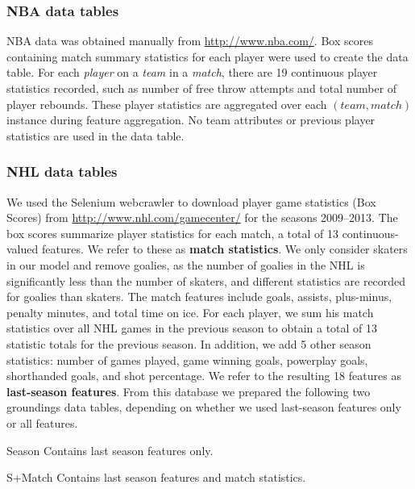 \documentclass[conference]{IEEEtran}
\begin{document}
\subsubsection{NBA data tables}
NBA data was obtained manually from \url{http://www.nba.com/}. Box scores containing match summary statistics for each player were used to create the data table. For each \textit{player} on a \textit{team} in a \textit{match}, there are 19 continuous player statistics recorded, such as number of free throw attempts and total number of player rebounds. These player statistics are aggregated over each $(team,match)$ instance during feature aggregation. No team attributes or previous player statistics are used in the data table.

\subsubsection{NHL data tables}

We used the Selenium webcrawler \cite{bib:crawler} to download player game statistics (Box Scores) from \url{http://www.nhl.com/gamecenter/} for the seasons 2009--2013. The box scores summarize player statistics for each match, a total of 13 continuous-valued features. We refer to these as \textbf{match statistics}. We only consider skaters in our model and remove goalies, as the number of goalies in the NHL is significantly less than the number of skaters, and different statistics are recorded for goalies than skaters. The match features include goals, assists, plus-minus, penalty minutes, and total time on ice. For each player, we sum his match statistics over all NHL games in the previous season to obtain a total of 13 statistic totals for the previous season. In addition, we add 5 other season statistics: number of games played, game winning goals, powerplay goals, shorthanded goals, and shot percentage. We refer to the resulting 18 features as \textbf{last-season features}. From this database we prepared the following two groundings data tables, depending on whether we used last-season features only or all features.

\begin{LaTeXdescription}
\item[Season] Contains last season features only.
\item[S+Match] Contains last season features and match statistics.
\end{LaTeXdescription}
\end{document}
